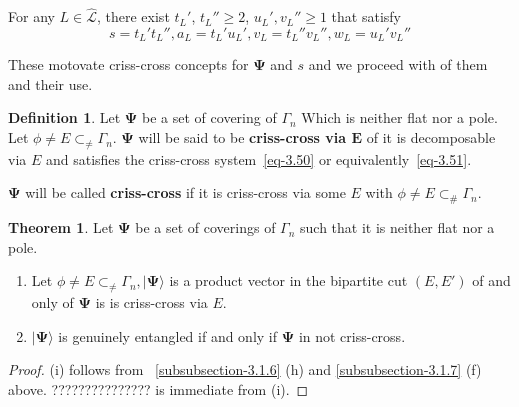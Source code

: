 \documentclass[a4paper,12pt]{article}
\theoremstyle{definition}
\theoremstyle{underlinethm}
\newtheorem{thm}{Theorem}[section]
\newtheorem{definition}{Definition}[section]
\theoremstyle{definition}
\begin{document}
\begin{enumerate}[label=(\alph*)]
For any $L \in \hat{\mathcal{L}}$, there exist $t_{L}'$, $t_{L}'' \geq 2$, $u_{L}', v_{L}'' \geq 1$ that satisfy
\begin{equation}
s = t_{L}' t_{L}'', a_{L} = t_{L}' u_{L}', v_{L} = t_{L}'' v_{L}'', w_{L} =u_{L}' v_{L}''\tag{3.51}\label{eq-3.51}
\end{equation}   
  
  These motovate criss-cross concepts for $\boldsymbol{\Psi}$ and $s$ and we proceed with of them and their use.
  
\end{enumerate}

\begin{definition}\label{definition-3.4}
Let $\boldsymbol{\Psi}$ be a set of covering of $\Gamma_{n}$ Which is neither flat nor a pole. Let $\phi  \neq E \subset_{\neq} \Gamma_{n}$. $\boldsymbol{\Psi}$ will be said to be \textbf{criss-cross via $\mathbf{E}$} of it is decomposable via $E$ and satisfies the criss-cross system~\eqref{eq-3.50} or equivalently~\eqref{eq-3.51}.

$\boldsymbol{\Psi}$ will be called \textbf{criss-cross} if it is criss-cross via some $E$ with $\phi \neq E \subset_{\#} \Gamma_{n}$.

\end{definition}

\begin{thm}\label{thm-3.7}
Let $\boldsymbol{\Psi}$ be a set of coverings of $\Gamma_{n}$ such that it is neither flat nor a pole.
\begin{enumerate}[label=(\roman*)]
\item Let $\phi \neq E \subset_{\neq} \Gamma_{n}, | \boldsymbol{\Psi}\rangle$ is a product vector in the bipartite cut $(E, E')$ of and only of $\boldsymbol{\Psi}$ is is criss-cross via $E$.
\item $| \boldsymbol{\Psi} \rangle$ is genuinely entangled if and only if $\boldsymbol{\Psi}$ in not criss-cross.
\end{enumerate}

\end{thm}


\begin{proof}
(i) follows from ~\eqref{subsubsection-3.1.6} (h) and \eqref{subsubsection-3.1.7} (f) above. ??????????????? is immediate from (i). 
\end{proof}
\end{document}
